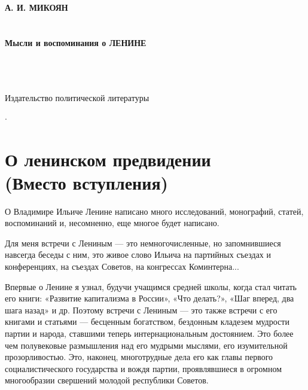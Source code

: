 \documentclass[12pt, a4paper, openany]{book}
\begin{document}
	
	\begin{titlepage}
		
		\begin{center}
			\vspace*{\fill}
			
			
			{\large\bf А. И. МИКОЯН\\}
			\ \\
			\ \\
			{\Huge\bf Мысли и воспоминания о ЛЕНИНЕ\\}
			\ \\
			\ \\
			\ \\
			\vspace*{\fill}
			
			\vfill
			
			
Издательство политической литературы
			
 $\cdot$ 
			

		\end{center}
		
	\end{titlepage}
	
	\thispagestyle{empty} %
	
	\newpage
	

\setcounter{secnumdepth}{0}
	
	\section[О ленинском предвидении (Вместо вступления)]{\center \textbf{О ленинском предвидении} \\ {\normalsize (Вместо вступления)}}


О Владимире Ильиче Ленине написано много исследований, монографий, статей, воспоминаний и, несомненно, еще многое будет написано.

Для меня встречи с Лениным — это немногочисленные, но запомнившиеся навсегда беседы с ним, это живое слово Ильича на партийных съездах и конференциях, на съездах Советов, на конгрессах Коминтерна...

Впервые о Ленине я узнал, будучи учащимся средней школы, когда стал читать его книги: «Развитие капитализма в России», «Что делать?», «Шаг вперед, два шага назад» и др. Поэтому встречи с Лениным — это также встречи с его книгами и статьями — бесценным богатством, бездонным кладезем мудрости партии и народа, ставшими теперь интернациональным достоянием. Это более чем полувековые размышления над его мудрыми мыслями, его изумительной прозорливостью. Это, наконец, многотрудные дела его как главы первого социалистического государства и вождя партии, проявлявшиеся в огромном многообразии свершений молодой республики Советов.
\end{document}
